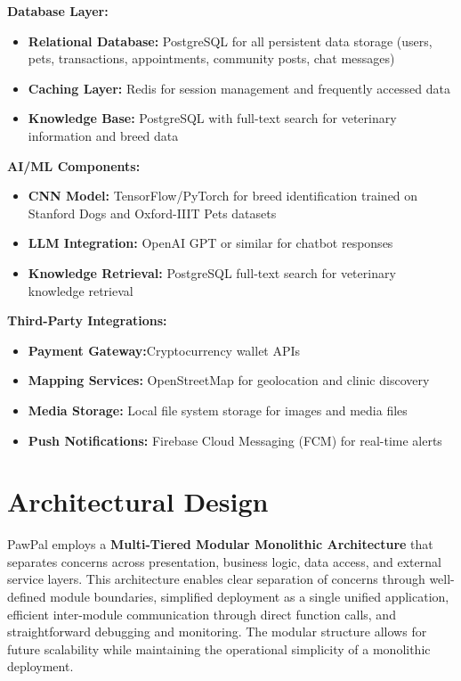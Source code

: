\textbf{Database Layer:}
\begin{itemize}
    \item \textbf{Relational Database:} PostgreSQL for all persistent data storage (users, pets, transactions, appointments, community posts, chat messages)
    \item \textbf{Caching Layer:} Redis for session management and frequently accessed data
    \item \textbf{Knowledge Base:} PostgreSQL with full-text search for veterinary information and breed data
\end{itemize}

\textbf{AI/ML Components:}
\begin{itemize}
    \item \textbf{CNN Model:} TensorFlow/PyTorch for breed identification trained on Stanford Dogs and Oxford-IIIT Pets datasets
    \item \textbf{LLM Integration:} OpenAI GPT or similar for chatbot responses
    \item \textbf{Knowledge Retrieval:} PostgreSQL full-text search for veterinary knowledge retrieval
\end{itemize}

\textbf{Third-Party Integrations:}
\begin{itemize}
    \item \textbf{Payment Gateway:}Cryptocurrency wallet APIs
    \item \textbf{Mapping Services:} OpenStreetMap for geolocation and clinic discovery
    \item \textbf{Media Storage:} Local file system storage for images and media files
    \item \textbf{Push Notifications:} Firebase Cloud Messaging (FCM) for real-time alerts
\end{itemize}

\section{Architectural Design}

PawPal employs a \textbf{Multi-Tiered Modular Monolithic Architecture} that separates concerns across presentation, business logic, data access, and external service layers. This architecture enables clear separation of concerns through well-defined module boundaries, simplified deployment as a single unified application, efficient inter-module communication through direct function calls, and straightforward debugging and monitoring. The modular structure allows for future scalability while maintaining the operational simplicity of a monolithic deployment.

